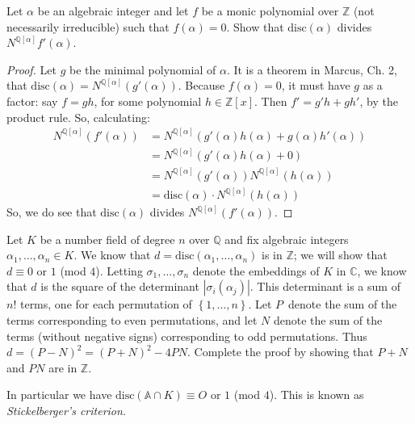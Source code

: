 \documentclass[12pt]{article}
\newcommand{\Q}{\mathbb{Q}}
\newcommand{\Z}{\mathbb{Z}}
\newcommand{\C}{\mathbb{C}}
\theoremstyle{definition}
\newenvironment{problem}[2][Problem]{\begin{trivlist}
\item[\hskip \labelsep {\bfseries #1}\hskip \labelsep {\bfseries #2.}]}{\end{trivlist}}
\begin{document}
\begin{problem}{21}
	Let $\alpha$ be an algebraic integer and let $f$ be a monic polynomial over $\Z$ (not necessarily irreducible) such that $f(\alpha) = 0$. Show that $\text{disc}(\alpha)$ divides $N^{\Q[\alpha]}f'(\alpha)$. 
	\begin{proof}
		Let $g$ be the minimal polynomial of $\alpha$. It is a theorem in Marcus, Ch. 2, that $\text{disc}(\alpha) = N^{\Q[\alpha]}(g'(\alpha))$. Because $f(\alpha) = 0$, it must have $g$ as a factor: say $f = gh$, for some polynomial $h \in \Z[x]$. Then $f' = g'h + gh'$, by the product rule. So, calculating:
		\begin{align*}
			N^{\Q[\alpha]}(f'(\alpha)) &= N^{\Q[\alpha]}(g'(\alpha)h(\alpha) + g(\alpha)h'(\alpha))\\
			&= N^{\Q[\alpha]}(g'(\alpha)h(\alpha) + 0)\\
			&= N^{\Q[\alpha]}(g'(\alpha))N^{\Q[\alpha]}(h(\alpha))\\
			&= \text{disc}(\alpha) \cdot N^{\Q[\alpha]}(h(\alpha))
		\end{align*}
		So, we do see that $\text{disc}(\alpha)$ divides $N^{\Q[\alpha]}(f'(\alpha))$.
	\end{proof}
\end{problem}
\begin{problem}{22}
	Let $K$ be a number field of degree $n$ over $\Q$ and fix algebraic integers $\alpha_1, \dots , \alpha_n \in K$. We know that $d = \text{disc}(\alpha_1, \dots , \alpha_n)$ is in $\Z$; we will show that $d \equiv 0$ or $1$ (mod $4$). Letting $\sigma_1, \dots , \sigma_n$ denote the embeddings of $K$ in $\C$, we know that $d$ is the square of the determinant $\left \lvert { \sigma_i(\alpha_j) } \right \lvert $. This determinant is a sum of $n!$ terms, one for each permutation of $\left\{ 1, \dots , n \right\}$. Let $P$ denote the sum of the terms corresponding to even permutations, and let $N$ denote the sum of the terms (without negative signs) corresponding to odd permutations. Thus $d = (P - N)^2 = (P + N)^2 - 4PN$. Complete the proof by showing that $P + N$ and $PN$ are in $\Z$.
	\par In particular we have $\text{disc}(\mathbb A \cap K) \equiv O$ or $1$ (mod $4$). This is known as \textit{Stickelberger's criterion.}
\end{problem}
\end{document}
